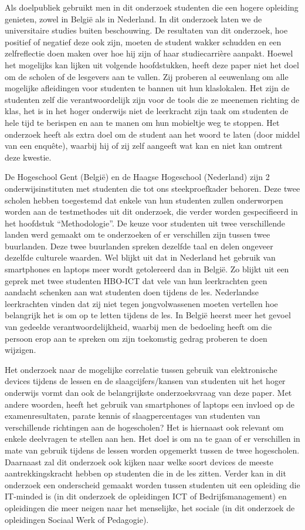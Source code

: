 Als doelpubliek gebruikt men in dit onderzoek studenten die een hogere opleiding genieten, zowel in België als in Nederland. In dit onderzoek laten we de universitaire studies buiten beschouwing. De resultaten van dit onderzoek, hoe positief of negatief deze ook zijn, moeten de student wakker schudden en een zelfreflectie doen maken over hoe hij zijn of haar studiecarrière aanpakt. Hoewel het mogelijks kan lijken uit volgende hoofdstukken, heeft deze paper niet het doel om de scholen of de lesgevers aan te vallen. Zij proberen al eeuwenlang om alle mogelijke afleidingen voor studenten te bannen uit hun klaslokalen. Het zijn de studenten zelf die verantwoordelijk zijn voor de tools die ze meenemen richting de klas, het is in het hoger onderwijs niet de leerkracht zijn taak om studenten de hele tijd te berispen en aan te manen om hun mobieltje weg te stoppen. Het onderzoek heeft als extra doel om de student aan het woord te laten (door middel van een enquête), waarbij hij of zij zelf aangeeft wat kan en niet kan omtrent deze kwestie.

De Hogeschool Gent (België) en de Haagse Hogeschool (Nederland) zijn 2 onderwijsinstituten met studenten die tot ons steekproefkader behoren. Deze twee scholen hebben toegestemd dat enkele van hun studenten zullen onderworpen worden aan de testmethodes uit dit onderzoek, die verder worden gespecifieerd in het hoofdstuk “Methodologie”. De keuze voor studenten uit twee verschillende landen werd gemaakt om te onderzoeken of er verschillen zijn tussen twee buurlanden. Deze twee buurlanden spreken dezelfde taal en delen ongeveer dezelfde culturele waarden. Wel blijkt uit \textcite{VanGaalen2017} dat in Nederland het gebruik van smartphones en laptops meer wordt getolereerd dan in België. Zo blijkt uit een geprek met twee studenten HBO-ICT dat vele van hun leerkrachten geen aandacht schenken aan wat studenten doen tijdens de les. Nederlandse leerkrachten vinden dat zij niet tegen jongvolwassenen moeten vertellen hoe belangrijk het is om op te letten tijdens de les. In België heerst meer het gevoel van gedeelde verantwoordelijkheid, waarbij men de bedoeling heeft om die persoon erop aan te spreken om zijn toekomstig gedrag proberen te doen wijzigen.

Het onderzoek naar de mogelijke correlatie tussen gebruik van elektronische devices tijdens de lessen en de slaagcijfers/kansen van studenten uit het hoger onderwijs vormt dan ook de belangrijkste onderzoeksvraag van deze paper. Met andere woorden, heeft het gebruik van smartphones of laptops een invloed op de examenresultaten, parate kennis of slaagpercentages van studenten van verschillende richtingen aan de hogescholen? Het is hiernaast ook relevant om enkele deelvragen te stellen aan hen. Het doel is om na te gaan of er verschillen in mate van gebruik tijdens de lessen worden opgemerkt tussen de twee hogescholen. Daarnaast zal dit onderzoek ook kijken naar welke soort devices de meeste aantrekkingskracht hebben op studenten die in de les zitten. Verder kan in dit onderzoek een onderscheid gemaakt worden tussen studenten uit een opleiding die IT-minded is (in dit onderzoek de opleidingen ICT of Bedrijfsmanagement) en opleidingen die meer neigen naar het menselijke, het sociale (in dit onderzoek de opleidingen Sociaal Werk of Pedagogie).

